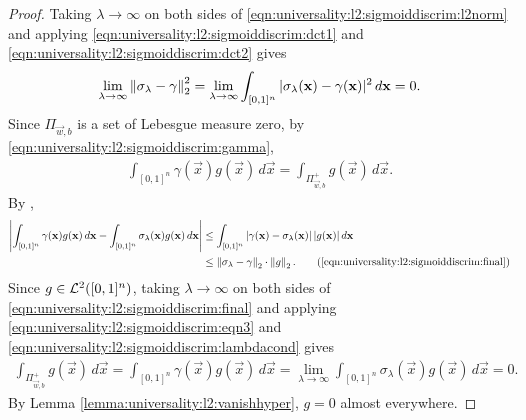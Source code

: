 \begin{proof}
Taking $\lambda \to \infty$ on both sides of \ref{eqn:universality:l2:sigmoiddiscrim:l2norm} and applying \ref{eqn:universality:l2:sigmoiddiscrim:dct1} and \ref{eqn:universality:l2:sigmoiddiscrim:dct2} gives
\begin{align}
    \label{eqn:universality:l2:sigmoiddiscrim:eqn3}
   \lim_{\lambda \to \infty} \left\lVert\sigma_\lambda - \gamma\right\rVert_2^{2} =  \lim_{\lambda \to \infty} \int_{[0,1]^n} |\sigma_\lambda(\mathbf{x}) - \gamma(\mathbf{x})|^2 \, d\mathbf{x} = 0.
\end{align}
Since $\Pi_{\vec{w}, b}$ is a set of Lebesgue measure zero, by \ref{eqn:universality:l2:sigmoiddiscrim:gamma}, 
\begin{align}
    \int_{[0,1]^n} \gamma(\vec{x}) g(\vec{x})\,d\vec{x} = \int_{\Pi_{\vec{w}, b}^{+}}  g(\vec{x})\,d\vec{x}.
\end{align}
By ,
\begin{subequations}\label{eqn:universality:l2:sigmoiddiscrim:final}
\begin{align*}
  \left | \int_{[0,1]^n} \gamma(\vec{x}) g(\vec{x})\,d\vec{x} - \int_{[0,1]^n} \sigma_\lambda(\vec{x})  g(\vec{x})\,d\vec{x} \right|  &\leq  \int_{[0,1]^n} \left |\gamma(\vec{x}) - \sigma_\lambda(\vec{x}) \right | |g(\vec{x})| \, d\vec{x} \\
  &\leq \norm{\sigma_\lambda - \gamma}_2 \cdot \norm{g}_2.
     \tag{\ref{eqn:universality:l2:sigmoiddiscrim:final}} 
\end{align*}
\end{subequations}
Since $g \in {\mathcal {L}^2}([0,1]^n)$, taking $\lambda \to \infty$  on both sides of \ref{eqn:universality:l2:sigmoiddiscrim:final} and applying \ref{eqn:universality:l2:sigmoiddiscrim:eqn3} and \ref{eqn:universality:l2:sigmoiddiscrim:lambdacond} gives
\begin{align}
    \label{eqn:universality:l2:sigmoiddiscrim:conclusioneqn}
    \int_{\Pi_{\vec{w}, b}^{+}}  g(\vec{x})\,d\vec{x} = \int_{[0,1]^n} \gamma(\vec{x}) g(\vec{x})\,d\vec{x} = \lim_{\lambda \to \infty}  \int_{[0,1]^n} \sigma_\lambda(\vec{x})  g(\vec{x})\,d\vec{x} = 0.
\end{align}
By Lemma \ref{lemma:universality:l2:vanishhyper}, $g = 0$ almost everywhere.
\end{proof}
